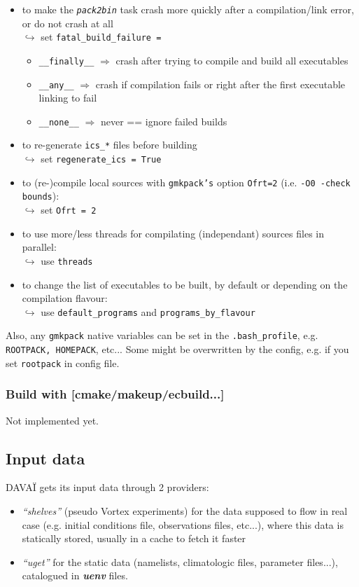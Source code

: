 \documentclass[a4paper,10pt,twoside]{article}
\begin{document}
\begin{itemize}
 \item to make the \texttt{\textit{pack2bin}} task crash more quickly after a compilation/link error, or do not crash at all\\
 $\hookrightarrow$ set \texttt{fatal\_build\_failure =}
 \begin{itemize}[label=$*$]
  \item \texttt{\_\_finally\_\_} $\Rightarrow$ crash after trying to compile and build all executables
  \item \texttt{\_\_any\_\_} $\Rightarrow$ crash if compilation fails or right after the first executable linking to fail
  \item \texttt{\_\_none\_\_} $\Rightarrow$ never == ignore failed builds
 \end{itemize}
 \item to re-generate \texttt{ics\_*} files before building\\
 $\hookrightarrow$ set \texttt{regenerate\_ics = True}
 \item to (re-)compile local sources with \texttt{gmkpack's} option \texttt{Ofrt=2} (i.e. \texttt{-O0 -check bounds}):\\
 $\hookrightarrow$ set \texttt{Ofrt = 2}
 \item to use more/less threads for compilating (independant) sources files in parallel:\\
 $\hookrightarrow$ use \texttt{threads}
 \item to change the list of executables to be built, by default or depending on the compilation flavour:\\
 $\hookrightarrow$ use \texttt{default\_programs} and \texttt{programs\_by\_flavour}
\end{itemize}
\noindent Also, any \texttt{gmkpack} native variables can be set in the \texttt{.bash\_profile}, e.g. \texttt{ROOTPACK, HOMEPACK}, etc... Some might be overwritten by the config, e.g. if you set \texttt{rootpack} in config file.

\subsubsection{Build with [cmake/makeup/ecbuild...]}
Not implemented yet.

\subsection{Input data}
DAVAÏ gets its input data through 2 providers:
\begin{itemize}
 \item \textit{``shelves''} (pseudo Vortex experiments) for the data supposed to flow in real case (e.g. initial conditions file, observations files, etc...), where this data is statically stored, usually in a cache to fetch it faster
 \item \textit{``uget''} for the static data (namelists, climatologic files, parameter files...), catalogued in \textit{\textbf{uenv}} files.
\end{itemize}
\end{document}
